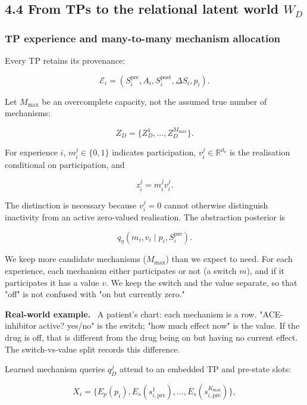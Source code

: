 \documentclass[11pt]{article}
\newenvironment{plainword}{%
  \par\medskip\noindent\begin{minipage}{\textwidth}%
  \color{gray!75!black}\small\itshape
}{%
  \end{minipage}\par\medskip}
\newenvironment{example}{%
  \par\smallskip\noindent\begin{minipage}{\textwidth}%
  \color{teal!60!black}\small
  \textbf{\color{teal!70!black}Real-world example.}\
}{%
  \end{minipage}\par\smallskip}
\begin{document}
\subsection*{4.4 From TPs to the relational latent world $W_D$}

\subsubsection*{TP experience and many-to-many mechanism allocation}

Every TP retains its provenance:

\[
\boxed{
\mathcal E_i=(S_i^{\mathrm{pre}},A_i,S_i^{\mathrm{post}},\Delta S_i,p_i).}
\]

Let $M_{\max}$ be an overcomplete capacity, not the assumed true number of mechanisms:

\[
Z_D=\{Z_D^1,\ldots,Z_D^{M_{\max}}\}.
\]

For experience $i$, $m_i^j\in\{0,1\}$ indicates participation, $v_i^j\in\mathbb R^{d_v}$ is the realisation conditional on
participation, and

\[
\boxed{z_i^j=m_i^jv_i^j.}
\]

The distinction is necessary because $v_i^j=0$ cannot otherwise distinguish inactivity from an active zero-valued realisation. The
abstraction posterior is

\[
\boxed{q_\eta(m_i,v_i\mid p_i,S_i^{\mathrm{pre}}).}
\]

\begin{plainword}
We keep more candidate mechanisms ($M_{\max}$) than we expect to need. For each experience, each mechanism either participates or
not (a switch $m$), and if it participates it has a value $v$. We keep the switch and the value separate, so that "off" is not
confused with "on but currently zero."
\end{plainword}

\begin{example}
A patient's chart: each mechanism is a row. "ACE-inhibitor active? yes/no" is the switch; "how much effect now" is the value. If the
drug is off, that is different from the drug being on but having no current effect. The switch-vs-value split records this
difference.
\end{example}

Learned mechanism queries $q_D^j$ attend to an embedded TP and pre-state slots:

\[
X_i=\{E_p(p_i),E_s(s_{i,\mathrm{pre}}^1),\ldots,E_s(s_{i,\mathrm{pre}}^{K_{\max}})\},
\]
\end{document}
